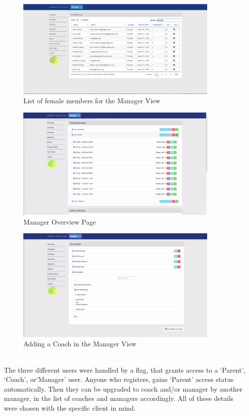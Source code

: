 \documentclass{l3proj}
\begin{document}
{
\begin{figure}[h!]
\caption{List of female members for the Manager View}
\centering
\includegraphics[width=10cm]{managerlistofMembersFemale.jpg}
\end{figure}
}
{
\begin{figure}[h!]
\caption{Manager Overview Page}
\centering
\includegraphics[width=10cm]{managerOverview.jpg}
\end{figure}
}
{
\begin{figure}[!h]
\caption{Adding a Coach in the Manager View}
\centering
\includegraphics[width=10cm]{managerCoachList.jpg}
\end{figure}
}
\\
The three different users were handled by a flag, that grants access to a `Parent', `Coach', or`Manager' user. Anyone who registers, gains `Parent' access status automatically. Then they can be upgraded to coach and/or manager by another manager, in the list of coaches and managers accordingly. All of these details were chosen with the specific client in mind.\\
\end{document}
